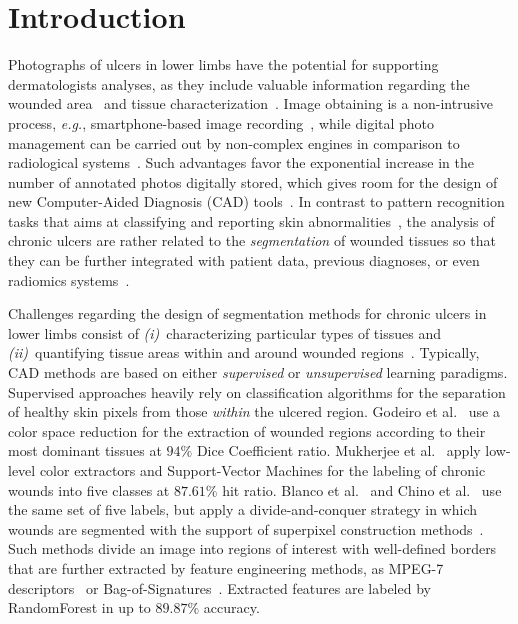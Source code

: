 \section{Introduction}

Photographs of ulcers in lower limbs have the potential for supporting dermatologists analyses, as they include valuable information regarding the wounded area~\cite{Bates2016} and tissue characterization~\cite{Blanco2016,Todd2018}.
Image obtaining is a non-intrusive process, \textit{e.g.}, smartphone-based image recording~\cite{Deserno2018,Goyal2018}, while digital photo management can be carried out by non-complex engines in comparison to radiological systems~\cite{Gillies2015}.
Such advantages favor the exponential increase in the number of annotated photos digitally stored, which gives room for the design of new Computer-Aided Diagnosis (CAD) tools~\cite{Chino2018,Deserno2018}.
In contrast to pattern recognition tasks that aims at classifying and reporting skin abnormalities~\cite{Zahia2018}, the analysis of chronic ulcers are rather related to the \textit{segmentation} of wounded tissues so that they can be further integrated with patient data, previous diagnoses, or even radiomics systems~\cite{Gillies2015}.

Challenges regarding the design of segmentation methods for chronic ulcers in lower limbs consist of \textit{(i)}~characterizing particular types of tissues and 
\textit{(ii)}~quantifying tissue areas within and around wounded regions~\cite{Pereyra2014,Todd2018}.
Typically, CAD methods are based on either \textit{supervised} or \textit{unsupervised} learning paradigms.
Supervised approaches heavily rely on classification algorithms for the separation of  healthy skin pixels from those \textit{within} the ulcered region.
Godeiro et al.~\cite{Godeiro2018} use a color space reduction for the extraction of wounded regions according to their most dominant tissues at $94\%$ Dice Coefficient ratio.
Mukherjee et al.~\cite{Mukherjee2014} apply low-level color extractors and Support-Vector Machines for the labeling of chronic wounds into five classes at $87.61\%$ hit ratio.
Blanco et al.~\cite{Blanco2016} and Chino et al.~\cite{Chino2018} use the same set of five labels, but apply a divide-and-conquer strategy in which wounds are segmented with the support of superpixel construction methods~\cite{Achanta2012,Barbieri2015}.
Such methods divide an image into regions of interest with well-defined borders that are further extracted by feature engineering methods, as MPEG-7 descriptors~\cite{Blanco2016} or Bag-of-Signatures~\cite{Chino2018}. 
Extracted features are labeled by RandomForest in up to $89.87\%$ accuracy.


